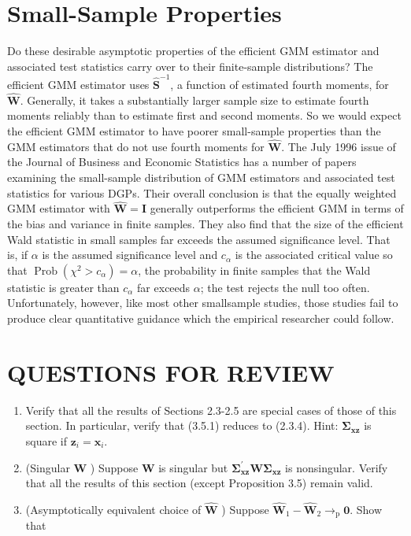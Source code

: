 \documentclass[10pt]{article}
\begin{document}
\section*{Small-Sample Properties}
Do these desirable asymptotic properties of the efficient GMM estimator and associated test statistics carry over to their finite-sample distributions? The efficient GMM estimator uses $\widehat{\mathbf{S}}^{-1}$, a function of estimated fourth moments, for $\widehat{\mathbf{W}}$. Generally, it takes a substantially larger sample size to estimate fourth moments reliably than to estimate first and second moments. So we would expect the efficient GMM estimator to have poorer small-sample properties than the GMM estimators that do not use fourth moments for $\widehat{\mathbf{W}}$. The July 1996 issue of the Journal of Business and Economic Statistics has a number of papers examining the small-sample distribution of GMM estimators and associated test statistics for various DGPs. Their overall conclusion is that the equally weighted GMM estimator with $\widehat{\mathbf{W}}=\mathbf{I}$ generally outperforms the efficient GMM in terms of the bias and variance in finite samples. They also find that the size of the efficient Wald statistic in small samples far exceeds the assumed significance level. That is, if $\alpha$ is the assumed significance level and $c_{\alpha}$ is the associated critical value so that $\operatorname{Prob}\left(\chi^{2}>c_{\alpha}\right)=\alpha$, the probability in finite samples that the Wald statistic is greater than $c_{\alpha}$ far exceeds $\alpha$; the test rejects the null too often. Unfortunately, however, like most other smallsample studies, those studies fail to produce clear quantitative guidance which the empirical researcher could follow.

\section*{QUESTIONS FOR REVIEW}
\begin{enumerate}
  \item Verify that all the results of Sections 2.3-2.5 are special cases of those of this section. In particular, verify that (3.5.1) reduces to (2.3.4). Hint: $\boldsymbol{\Sigma}_{\mathbf{x z}}$ is square if $\mathbf{z}_{i}=\mathbf{x}_{i}$.
  \item (Singular $\mathbf{W}$ ) Suppose $\mathbf{W}$ is singular but $\boldsymbol{\Sigma}_{\mathbf{x z}}^{\prime} \mathbf{W} \boldsymbol{\Sigma}_{\mathbf{x z}}$ is nonsingular. Verify that all the results of this section (except Proposition 3.5) remain valid.
  \item (Asymptotically equivalent choice of $\widehat{\mathbf{W}}$ ) Suppose $\widehat{\mathbf{W}}_{1}-\widehat{\mathbf{W}}_{2} \rightarrow_{\mathrm{p}} \mathbf{0}$. Show that
\end{enumerate}
\end{document}
